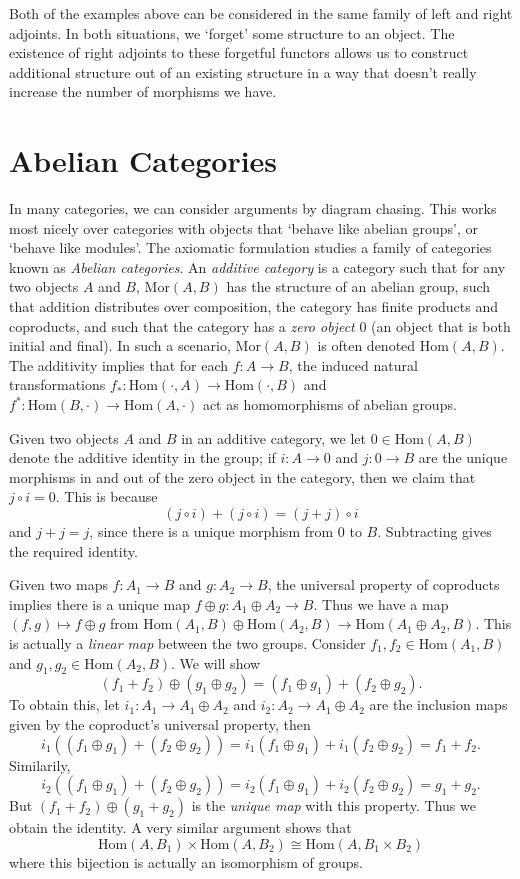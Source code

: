 Both of the examples above can be considered in the same family of left and right adjoints. In both situations, we `forget' some structure to an object. The existence of right adjoints to these forgetful functors allows us to construct additional structure out of an existing structure in a way that doesn't really increase the number of morphisms we have.

\chapter{Abelian Categories}

In many categories, we can consider arguments by diagram chasing. This works most nicely over categories with objects that `behave like abelian groups', or `behave like modules'. The axiomatic formulation studies a family of categories known as \emph{Abelian categories}. An \emph{additive category} is a category such that for any two objects $A$ and $B$, $\text{Mor}(A,B)$ has the structure of an abelian group, such that addition distributes over composition, the category has finite products and coproducts, and such that the category has a \emph{zero object} $0$ (an object that is both initial and final). In such a scenario, $\text{Mor}(A,B)$ is often denoted $\text{Hom}(A,B)$. The additivity implies that for each $f: A \to B$, the induced natural transformations $f_*: \text{Hom}(\cdot,A) \to \text{Hom}(\cdot,B)$ and $f^*: \text{Hom}(B,\cdot) \to \text{Hom}(A,\cdot)$ act as homomorphisms of abelian groups.

Given two objects $A$ and $B$ in an additive category, we let $0 \in \text{Hom}(A,B)$ denote the additive identity in the group; if $i: A \to 0$ and $j: 0 \to B$ are the unique morphisms in and out of the zero object in the category, then we claim that $j \circ i = 0$. This is because
%
\[ (j \circ i) + (j \circ i) = (j + j) \circ i \]
%
and $j + j = j$, since there is a unique morphism from $0$ to $B$. Subtracting gives the required identity.

Given two maps $f: A_1 \to B$ and $g: A_2 \to B$, the universal property of coproducts implies there is a unique map $f \oplus g: A_1 \oplus A_2 \to B$. Thus we have a map $(f,g) \mapsto f \oplus g$ from $\text{Hom}(A_1,B) \oplus \text{Hom}(A_2,B) \to \text{Hom}(A_1 \oplus A_2,B)$. This is actually a \emph{linear map} between the two groups. Consider $f_1,f_2 \in \text{Hom}(A_1,B)$ and $g_1,g_2 \in \text{Hom}(A_2,B)$. We will show
%
\[ (f_1 + f_2) \oplus (g_1 \oplus g_2) = (f_1 \oplus g_1) + (f_2 \oplus g_2). \]
%
To obtain this, let $i_1: A_1 \to A_1 \oplus A_2$ and $i_2: A_2 \to A_1 \oplus A_2$ are the inclusion maps given by the coproduct's universal property, then
%
\[ i_1((f_1 \oplus g_1) + (f_2 \oplus g_2)) = i_1(f_1 \oplus g_1) + i_1(f_2 \oplus g_2) = f_1 + f_2. \]
%
Similarily,
%
\[ i_2((f_1 \oplus g_1) + (f_2 \oplus g_2)) = i_2(f_1 \oplus g_1) + i_2(f_2 \oplus g_2) = g_1 + g_2. \]
%
But $(f_1 + f_2) \oplus (g_1 + g_2)$ is the \emph{unique map} with this property. Thus we obtain the identity. A very similar argument shows that
%
\[ \text{Hom}(A,B_1) \times \text{Hom}(A,B_2) \cong \text{Hom}(A,B_1 \times B_2) \]
%
where this bijection is actually an isomorphism of groups.


